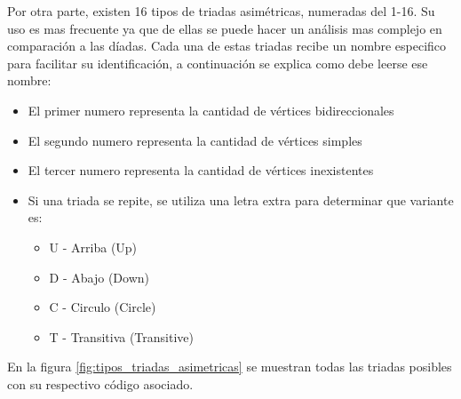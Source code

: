 Por otra parte, existen 16 tipos de triadas asimétricas, numeradas del 1-16. Su uso es mas frecuente ya que de ellas se puede hacer un análisis mas complejo en comparación a las díadas. Cada una de estas triadas recibe un nombre especifico para facilitar su identificación, a continuación se explica como debe leerse ese nombre:

\begin{itemize}
  \item El primer numero representa la cantidad de vértices bidireccionales
  \item El segundo numero representa la cantidad de vértices simples
  \item El tercer numero representa la cantidad de vértices inexistentes
  \item Si una triada se repite, se utiliza una letra extra para determinar que variante es:
  \begin{itemize}
    \item U - Arriba (Up)
    \item D - Abajo (Down)
    \item C - Circulo (Circle)
    \item T - Transitiva (Transitive)
  \end{itemize}
\end{itemize}

En la figura \ref{fig:tipos_triadas_asimetricas} se muestran todas las triadas posibles con su respectivo código asociado.

